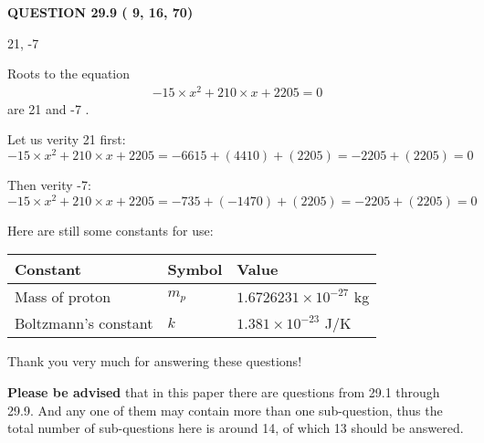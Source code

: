 \documentclass[12pt]{article}
\begin{document}
\noindent{}

 
 
  
\vspace{0.2in}
  
{\textbf{\Large{QUESTION
29.9 
 (          9,         16,         70)
}}}
  
  


 
 
\noindent{}

21,  %
-7
 
 
 
 
 
\noindent{}

Roots to the equation
\begin{eqnarray*}
-15 \times x^2  %
+  %
210
                 \times x    %
+  %
2205 =0
\end{eqnarray*}
are  %
21 and  %
-7 .
 
Let us verity  %
21 first:
$  %
-15 \times x^2  %
+  %
210
                 \times x    %
+  %
2205
  = %
-6615+( %
4410)+( %
2205)
  = %
-2205+( %
2205)
  = %
0
$
 
Then verity  %
-7:
$  %
-15 \times x^2  %
+  %
210
                 \times x    %
+  %
2205
  = %
-735+( %
-1470)+( %
2205)
  = %
-2205+( %
2205)
  = %
0
$
 
 
 
   
   
 \vspace{0.2in}
Here are still some constants for use:
 
 
\noindent\begin{tabular}{|l|l|l|}
\hline
Constant & Symbol & Value \\
\hline
 
Mass of proton &
$m_p$ &
 $ 1.6726231 \times 10^{-27} $
kg \\
\hline
 
Boltzmann's constant &
$k$ &
 $ 1.381 \times 10^{-23} $
J/K \\
\hline
 
\end{tabular}
 
Thank you very much for answering these questions!
 
{\textbf{\large{Please be advised}}} that in this paper there are questions from
29.1 through
29.9.
And any one of them may contain more than one sub-question, thus the total number
of sub-questions here is around 14, of which
13 should be answered.
 
\end{document}
